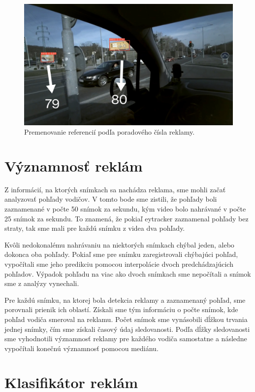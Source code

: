 \begin{figure}[ht]
     \centering
     \includegraphics[width=1\textwidth]{images/04/mapping.jpg}
     \caption{Premenovanie referencií podľa poradového čísla reklamy.}
     \label{img:mapping}
 \end{figure}

\section{Významnosť reklám}

Z informácií, na ktorých snímkach sa nachádza reklama, sme mohli začať analyzovať pohľady vodičov. V tomto bode sme zistili, že pohľady boli zaznamenané v počte 50 snímok za sekundu, kým video bolo nahrávané v počte 25 snímok za sekundu. To znamená, že pokiaľ eytracker zaznamenal pohľady bez straty, tak sme mali pre každú snímku z videa dva pohľady.

Kvôli nedokonalému nahrávaniu na niektorých snímkach chýbal jeden, alebo dokonca oba pohľady. Pokiaľ sme pre snímku zaregistrovali chýbajúci pohľad, vypočítali sme jeho predikciu pomocou interpolácie dvoch predchádzajúcich pohľadov. Výpadok pohľadu na viac ako dvoch snímkach sme nepočítali a snímok sme z analýzy vynechali.

Pre každú snímku, na ktorej bola detekcia reklamy a zaznamenaný pohľad, sme porovnali prienik ich oblastí. Získali sme tým informáciu o počte snímok, kde pohľad vodiča smeroval na reklamu. Počet snímok sme vynásobili dĺžkou trvania jednej snímky, čím sme získali časový údaj sledovanosti. Podľa dĺžky sledovanosti sme vyhodnotili významnosť reklamy pre každého vodiča samostatne a následne vypočítali konečnú významnosť pomocou mediánu.

\section{Klasifikátor reklám}


